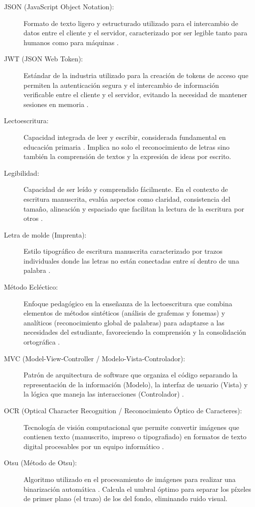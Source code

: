 \documentclass[12pt]{article}
\begin{document}
\begin{description}
    \item[JSON (JavaScript Object Notation):] Formato de texto ligero y estructurado utilizado para el intercambio de datos entre el cliente y el servidor, caracterizado por ser legible tanto para humanos como para máquinas \cite{rfc8259}.
    \item[JWT (JSON Web Token):] Estándar de la industria utilizado para la creación de tokens de acceso que permiten la autenticación segura y el intercambio de información verificable entre el cliente y el servidor, evitando la necesidad de mantener sesiones en memoria \cite{rfc7519}.
    \item[Lectoescritura:] Capacidad integrada de leer y escribir, considerada fundamental en educación primaria \cite{raeDLE}. Implica no solo el reconocimiento de letras sino también la comprensión de textos y la expresión de ideas por escrito.
    \item[Legibilidad:] Capacidad de ser leído y comprendido fácilmente. En el contexto de escritura manuscrita, evalúa aspectos como claridad, consistencia del tamaño, alineación y espaciado que facilitan la lectura de la escritura por otros \cite{graham2006dimensions, rosenblum2003product}.
    \item[Letra de molde (Imprenta):] Estilo tipográfico de escritura manuscrita caracterizado por trazos individuales donde las letras no están conectadas entre sí dentro de una palabra \cite{raeDLE}.
    \item[Método Ecléctico:] Enfoque pedagógico en la enseñanza de la lectoescritura que combina elementos de métodos sintéticos (análisis de grafemas y fonemas) y analíticos (reconocimiento global de palabras) para adaptarse a las necesidades del estudiante, favoreciendo la comprensión y la consolidación ortográfica \cite{ortega2009eclectico}.
    \item[MVC (Model-View-Controller / Modelo-Vista-Controlador):] Patrón de arquitectura de software que organiza el código separando la representación de la información (Modelo), la interfaz de usuario (Vista) y la lógica que maneja las interacciones (Controlador) \cite{buschmann1996pattern}.
    \item[OCR (Optical Character Recognition / Reconocimiento Óptico de Caracteres):] Tecnología de visión computacional que permite convertir imágenes que contienen texto (manuscrito, impreso o tipografiado) en formatos de texto digital procesables por un equipo informático \cite{smith2007overview, plamondon2000online}.
    \item[Otsu (Método de Otsu):] Algoritmo utilizado en el procesamiento de imágenes para realizar una binarización automática \cite{otsu1979threshold}. Calcula el umbral óptimo para separar los píxeles de primer plano (el trazo) de los del fondo, eliminando ruido visual.

\end{description}
\end{document}
